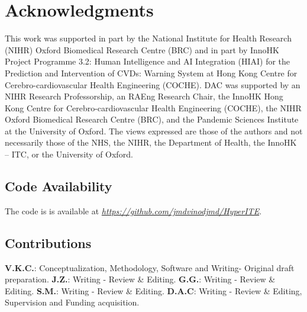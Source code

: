 \documentclass{article}
\begin{document}
\section*{Acknowledgments}
This work was supported in part by the National Institute for Health Research (NIHR) Oxford Biomedical Research Centre (BRC) and in part by InnoHK Project Programme 3.2: Human Intelligence and AI Integration (HIAI) for the Prediction and Intervention of CVDs: Warning System at Hong Kong Centre for Cerebro-cardiovascular Health Engineering (COCHE).
DAC was supported by an NIHR Research Professorship, an RAEng Research Chair, the InnoHK Hong Kong Centre for Cerebro-cardiovascular Health Engineering (COCHE), the NIHR Oxford Biomedical Research Centre (BRC), and the Pandemic Sciences Institute at the University of Oxford. 
The views expressed are those of the authors and not necessarily those of the NHS, the NIHR, the Department of Health, the InnoHK – ITC, or the University of Oxford.

\subsection*{Code Availability}
The code is is available at \textit{\url{https://github.com/jmdvinodjmd/HyperITE}}.

\subsection*{Contributions}
\textbf{V.K.C.}: Conceptualization, Methodology, Software and Writing- Original draft preparation. \textbf{J.Z.}: Writing - Review \& Editing. \textbf{G.G.}: Writing - Review \& Editing. \textbf{S.M.}: Writing - Review \& Editing. \textbf{D.A.C}: Writing - Review \& Editing, Supervision and Funding acquisition.
\end{document}
